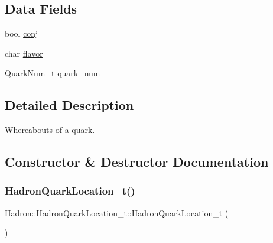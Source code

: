 \subsection*{Data Fields}
\begin{DoxyCompactItemize}
\item 
bool \mbox{\hyperlink{structHadron_1_1HadronQuarkLocation__t_a4fd64b1ec0731ff1017e9573768e1456}{conj}}
\item 
char \mbox{\hyperlink{structHadron_1_1HadronQuarkLocation__t_a31beaaffd8b2dec8d57b7020673e4e3d}{flavor}}
\item 
\mbox{\hyperlink{structHadron_1_1QuarkNum__t}{Quark\+Num\+\_\+t}} \mbox{\hyperlink{structHadron_1_1HadronQuarkLocation__t_ad4abb30a9e5f991c0eeeb4869457f8b6}{quark\+\_\+num}}
\end{DoxyCompactItemize}


\subsection{Detailed Description}
Whereabouts of a quark. 

\subsection{Constructor \& Destructor Documentation}
\mbox{\label{structHadron_1_1HadronQuarkLocation__t_a134386bb80be45cf0767a6c45e3b6f52}} 
\subsubsection{\texorpdfstring{HadronQuarkLocation\_t()}{HadronQuarkLocation\_t()}\hspace{0.1cm}{\footnotesize\ttfamily [1/4]}}
{\footnotesize\ttfamily Hadron\+::\+Hadron\+Quark\+Location\+\_\+t\+::\+Hadron\+Quark\+Location\+\_\+t (\begin{DoxyParamCaption}{ }\end{DoxyParamCaption})\hspace{0.3cm}{\ttfamily [inline]}}

\mbox{\label{structHadron_1_1HadronQuarkLocation__t_a214dddf7650dc22b5c424715fc27dd42}} 
